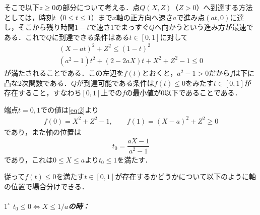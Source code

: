 \documentclass[../../main.tex]{subfiles}
\begin{document}
そこで以下$z\ge 0$の部分について考える．点$Q(X,Z)$（$Z>0$）へ到達する方法としては，時刻$t$（$0\le t\le1$）まで$x$軸の正方向へ速さ$a$で進み点$(at,0)$に達し，そこから残り時間$1-t$で速さ$1$でまっすぐ$Q$へ向かうという進み方が最速である．これで$Q$に到達できる条件はある$t\in[0,1]$に対して
\begin{align}
  (X-at)^2+Z^2\le(1-t)^2 \\
  (a^2-1)t^2+(2-2aX)t+X^2+Z^2-1\le0 \label{eq:2}
\end{align}
が満たされることである．この左辺を$f(t)$とおくと，$a^2-1>0$だから$f$は下に凸な2次関数である．$Q$が到達可能である条件は$f(t)\le0$をみたす$t\in[0,1]$が存在すること，すなわち$[0,1]$上での$f$の最小値が$0$以下であることである．

端点$t=0,1$での値は\cref{eq:2}より
\begin{align}
  f(0)=X^2+Z^2-1,\qquad f(1)=(X-a)^2+Z^2\ge0 \label{eq:3}
\end{align}
であり，また軸の位置は
\begin{align}
  t_0 = \dfrac{aX-1}{a^2-1} \label{eq:4}
\end{align}
であり，これは$0 \le X \le a$より$t_0 \le 1$を満たす．

従って$f(t)\le 0$を満たす$t\in[0,1]$が存在するかどうかについて以下のように軸の位置で場合分けできる．

\subparagraph{$1^\circ$ $t_0\le0\iff X\le1/a$の時：}
\end{document}

